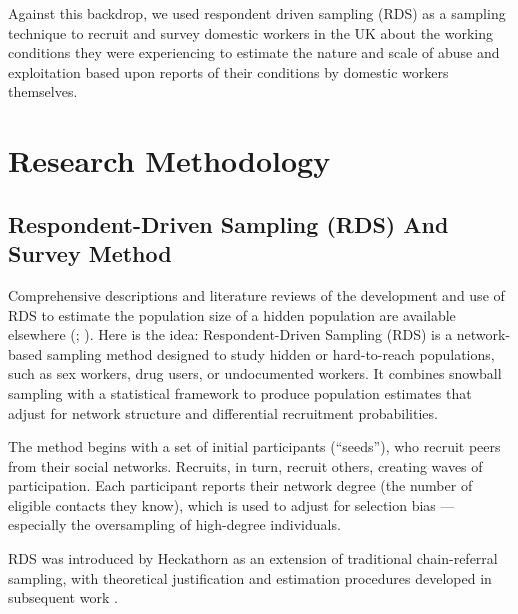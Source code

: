 \documentclass[
  12pt,
  letterpaper,
  DIV=11,
  numbers=noendperiod]{scrartcl}
\theoremstyle{plain}
\theoremstyle{definition}
\begin{document}
Against this backdrop, we used respondent driven sampling (RDS) as a
sampling technique to recruit and survey domestic workers in the UK
about the working conditions they were experiencing to estimate the
nature and scale of abuse and exploitation based upon reports of their
conditions by domestic workers themselves.

\section{Research Methodology}\label{research-methodology}

\subsection{Respondent-Driven Sampling (RDS) And Survey
Method}\label{respondent-driven-sampling-rds-and-survey-method}

Comprehensive descriptions and literature reviews of the development and
use of RDS to estimate the population size of a hidden population are
available elsewhere (\textcite{heckathorn_comment_2011};
\textcite{gile_methods_2018}). Here is the idea: Respondent-Driven
Sampling (RDS) is a network-based sampling method designed to study
hidden or hard-to-reach populations, such as sex workers, drug users, or
undocumented workers. It combines snowball sampling with a statistical
framework to produce population estimates that adjust for network
structure and differential recruitment probabilities.

The method begins with a set of initial participants (``seeds''), who
recruit peers from their social networks. Recruits, in turn, recruit
others, creating waves of participation. Each participant reports their
network degree (the number of eligible contacts they know), which is
used to adjust for selection bias --- especially the oversampling of
high-degree individuals.

RDS was introduced by Heckathorn as an extension of traditional
chain-referral sampling, with theoretical justification and estimation
procedures developed in subsequent work
\autocite{heckathorn_respondent-driven_1997,gile11-improved}.
\end{document}
